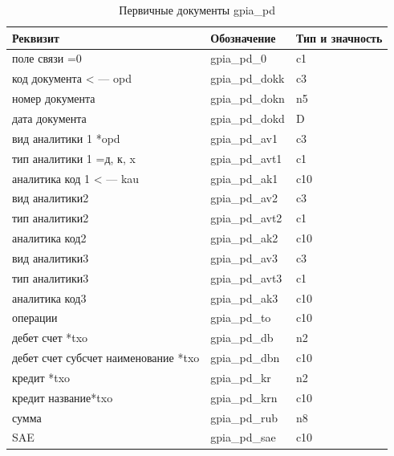 \begin{table}[h!p]
    \centering
    \scriptsize
    \caption{Первичные документы gpia\_pd}
    \begin{tabular}{|l|l|l|} 

\hline
\textbf{Реквизит}                   &\textbf{Обозначение}&\textbf{Тип и значность}  \\ \hline
поле связи               =0         &gpia\_pd\_0        &c1                         \\ \hline
код документа    < --- opd          &gpia\_pd\_dokk     &c3                         \\ \hline
номер документа                     &gpia\_pd\_dokn     &n5                         \\ \hline
дата документа                      &gpia\_pd\_dokd     &D                          \\ \hline
вид аналитики 1    *opd             &gpia\_pd\_av1      &c3                         \\ \hline
тип аналитики 1      =д, к, x       &gpia\_pd\_avt1     &c1                         \\ \hline
аналитика код 1   < --- kau         &gpia\_pd\_ak1      &c10                        \\ \hline
вид аналитики2                      &gpia\_pd\_av2      &c3                         \\ \hline
тип аналитики2                      &gpia\_pd\_avt2     &c1                         \\ \hline
аналитика код2                      &gpia\_pd\_ak2      &c10                        \\ \hline
вид аналитики3                      &gpia\_pd\_av3      &c3                         \\ \hline
тип аналитики3                      &gpia\_pd\_avt3     &c1                         \\ \hline
аналитика код3                      &gpia\_pd\_ak3      &c10                        \\ \hline
операции                            &gpia\_pd\_to       &c10                        \\ \hline
дебет счет *txo                     &gpia\_pd\_db       &n2                         \\ \hline
дебет счет субсчет наименование *txo&gpia\_pd\_dbn      &c10                        \\ \hline
кредит  *txo                        &gpia\_pd\_kr       &n2                         \\ \hline
кредит название*txo                 &gpia\_pd\_krn      &c10                        \\ \hline
сумма                               &gpia\_pd\_rub      &n8                         \\ \hline
SAE                                 &gpia\_pd\_sae      &c10                        \\ \hline

    \end{tabular}
\end{table}

